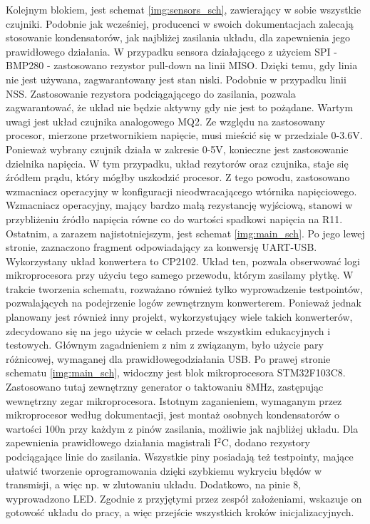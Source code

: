 Kolejnym blokiem, jest schemat \ref{img:sensors_sch}, zawierający w sobie wszystkie czujniki. Podobnie jak wcześniej, producenci w swoich dokumentacjach zalecają stosowanie kondensatorów, jak najbliżej zasilania układu, dla zapewnienia jego prawidłowego działania. W przypadku sensora działającego z użyciem SPI - BMP280 - zastosowano rezystor pull-down na linii MISO. Dzięki temu, gdy linia nie jest używana, zagwarantowany jest stan niski. Podobnie w przypadku linii NSS. Zastosowanie rezystora podciągającego do zasilania, pozwala zagwarantować, że układ nie będzie aktywny gdy nie jest to pożądane.\newline
Wartym uwagi jest układ czujnika analogowego MQ2. Ze względu na zastosowany procesor, mierzone przetwornikiem napięcie, musi mieścić się w przedziale 0-3.6V. Ponieważ wybrany czujnik działa w zakresie 0-5V, konieczne jest zastosowanie dzielnika napięcia. W tym przypadku, układ rezytorów oraz czujnika, staje się źródłem prądu, który mógłby uszkodzić procesor. Z tego powodu, zastosowano wzmacniacz operacyjny w konfiguracji nieodwracającego wtórnika napięciowego. Wzmacniacz operacyjny, mający bardzo małą rezystancję wyjściową, stanowi w przybliżeniu źródło napięcia równe co do wartości spadkowi napięcia na R11.
\newline
\newline
Ostatnim, a zarazem najistotniejszym, jest schemat \ref{img:main_sch}. Po jego lewej stronie, zaznaczono fragment odpowiadający za konwersję UART-USB. Wykorzystany układ konwertera to CP2102. Układ ten, pozwala obserwować logi mikroprocesora przy użyciu tego samego przewodu, którym zasilamy płytkę. W trakcie tworzenia schematu, rozważano również tylko wyprowadzenie testpointów, pozwalających na podejrzenie logów zewnętrznym konwerterem. Ponieważ jednak planowany jest również inny projekt, wykorzystujący wiele takich konwerterów, zdecydowano się na jego użycie w celach przede wszystkim edukacyjnych i testowych. Głównym zagadnieniem z nim z związanym, było użycie pary różnicowej, wymaganej dla prawidłowegodziałania USB.
\newline
Po prawej stronie schematu \ref{img:main_sch}, widoczny jest blok mikroprocesora STM32F103C8. Zastosowano tutaj zewnętrzny generator o taktowaniu 8MHz, zastępując wewnętrzny zegar mikroprocesora. Istotnym zaganieniem, wymaganym przez mikroprocesor według dokumentacji, jest montaż osobnych kondensatorów o wartości 100n przy każdym z pinów zasilania, możliwie jak najbliżej układu. Dla zapewnienia prawidłowego działania magistrali I$^2$C, dodano rezystory podciągające linie do zasilania. Wszystkie piny posiadają też testpointy, mające ułatwić tworzenie oprogramowania dzięki szybkiemu wykryciu błędów w transmisji, a więc np. w zlutowaniu układu. Dodatkowo, na pinie 8, wyprowadzono LED. Zgodnie z przyjętymi przez zespół założeniami, wskazuje on gotowość układu do pracy, a więc przejście wszystkich kroków inicjalizacyjnych.
